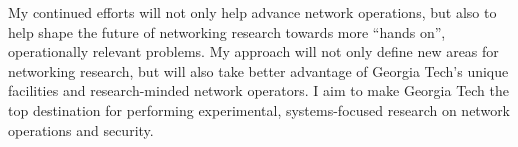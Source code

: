 

My continued efforts will not only help advance network operations, but
also to help shape the future of networking research towards more
``hands on'', operationally relevant problems.  My approach will not
only define new areas for networking research, but will also take better
advantage of Georgia Tech's unique facilities and research-minded
network operators.  I aim to make Georgia Tech the top destination for
performing experimental, systems-focused research on network operations
and security.

